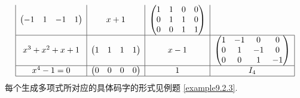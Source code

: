 \begin{solution}
$$\begin{array}{|c|c|c|c|}
\begin{pmatrix}
-1 & 1 & -1 & 1
\end{pmatrix} &x+1&
\begin{pmatrix}
1 & 1 & 0 & 0 \\
0 & 1 & 1 & 0 \\
0 & 0 & 1 & 1
\end{pmatrix} \\
\hline
x^3 + x^2 + x + 1 &
\begin{pmatrix}
1 & 1 & 1 & 1
\end{pmatrix} &x-1&
\begin{pmatrix}
1 & -1 & 0 & 0 \\
0 & 1 & -1 & 0 \\
0 & 0 & 1 & -1
\end{pmatrix} \\
\hline
x^4 - 1 = 0 &
\begin{pmatrix}
0 & 0 & 0 & 0
\end{pmatrix}&1 & I_4 \\
\hline
\end{array}
$$
每个生成多项式所对应的具体码字的形式见例题 \ref{example9.2.3}.
\end{solution}






